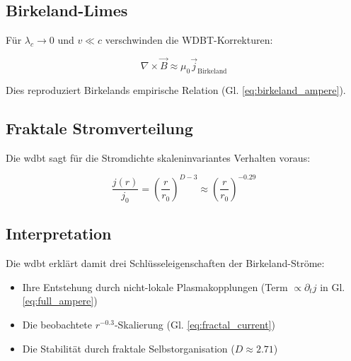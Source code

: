 \subsection{Birkeland-Limes}
Für $\lambda_c \to 0$ und $v \ll c$ verschwinden die WDBT-Korrekturen:

\begin{equation}
    \label{eq:birkeland_limit}
    \nabla \times \vec{B} \approx \mu_0 \vec{j}_{\text{Birkeland}}
\end{equation}

Dies reproduziert Birkelands empirische Relation (Gl. \ref{eq:birkeland_ampere}).

\subsection{Fraktale Stromverteilung}
Die \gls{wdbt} sagt für die Stromdichte skaleninvariantes Verhalten voraus:

\begin{equation}
    \label{eq:fractal_current}
    \frac{j(r)}{j_0} = \left(\frac{r}{r_0}\right)^{D-3} \approx \left(\frac{r}{r_0}\right)^{-0.29}
\end{equation}

\subsection{Interpretation}
Die \gls{wdbt} erklärt damit drei Schlüsseleigenschaften der Birkeland-Ströme:
\begin{itemize}
\item Ihre Entstehung durch nicht-lokale Plasmakopplungen (Term $\propto \partial_t j$ in Gl. \ref{eq:full_ampere})
\item Die beobachtete $r^{-0.3}$-Skalierung (Gl. \ref{eq:fractal_current})
\item Die Stabilität durch fraktale Selbstorganisation ($D \approx 2.71$)
\end{itemize}

